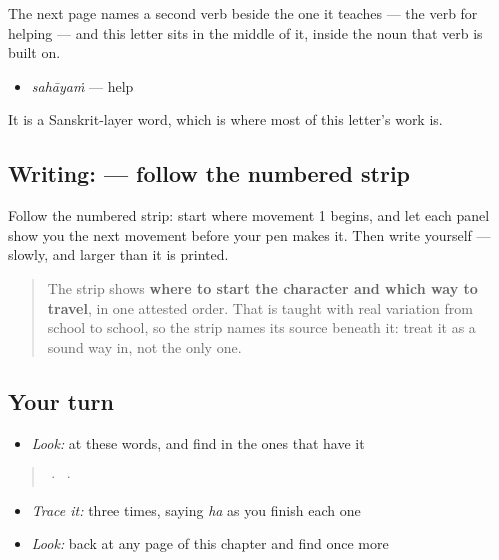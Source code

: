 The next page names a second verb beside the one it teaches — the verb for helping — and this letter sits in the middle of it, inside the noun that verb is built on.

\begin{itemize}
\raggedright
  \item \textbf{} \emph{sahāyaṁ} — help
\end{itemize}

It is a Sanskrit-layer word, which is where most of this letter's work is.

\subsection*{Writing:  — follow the numbered strip}

Follow the numbered strip: start where movement 1 begins, and let each panel show you the next movement before your pen makes it. Then write  yourself — slowly, and larger than it is printed.

\begin{quote}
The strip shows \textbf{where to start the character and which way to travel}, in one attested order. That is taught with real variation from school to school, so the strip names its source beneath it: treat it as a sound way in, not the only one.
\end{quote}

\subsection*{Your turn}
\begin{itemize}
\raggedright
  \item \emph{Look:} at these words, and find  in the ones that have it
\end{itemize}

\begin{quote}
  ·    ·  
\end{quote}

\begin{itemize}
\raggedright
  \item \emph{Trace it:}  three times, saying \emph{ha} as you finish each one
  \item \emph{Look:} back at any page of this chapter and find  once more
\end{itemize}


